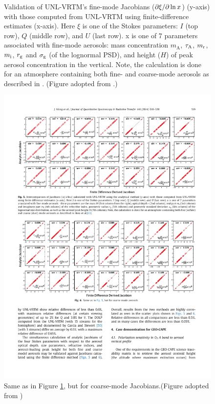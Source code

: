 \begin{landscape}
\begin{figure}[p]
  \caption[Validation of UNL-VRTM's fine-mode Jacobians calculation.] 
{Validation of UNL-VRTM's fine-mode Jacobians ($\partial\xi/\partial\ln{x}$) 
(y-axis) with those computed from UNL-VRTM using finite-difference estimates 
(x-axis). Here $\xi$ is one of the Stokes parameters: $I$ (top row), $Q$
(middle row), and $U$ (last row). x is one of 7 parameters associated 
with fine-mode aerosols: mass concentration $m_\text{A}$, $\tau_\text{A}$,
$m_\text{r}$, $m_\text{i}$, $r_\text{g}$ and $\sigma_\text{g}$ (of the lognormal PSD), and height
($H$) of peak aerosol concentration in the vertical. Note,
the calculation is done for an atmosphere containing both fine- 
and coarse-mode aerosols as described in \citet{Hess98}.
(Figure adopted from \citet{Wang14}.)}
  \label{fig:unlvrtm4}
\end{figure}
\end{landscape}

\begin{landscape}
\begin{figure}[p]
  \centering
  \includegraphics[width={1.4\textwidth}]{figures/unlvrtm5.pdf}
  \caption[Same as Figure \ref{fig:unlvrtm4}, but for coarse-mode
Jacobians.]{Same as in Figure \ref{fig:unlvrtm4}, but for coarse-mode
Jacobians.(Figure adopted from \citet{Wang14}) }
  \label{fig:unlvrtm5}
\end{figure}
\end{landscape}
